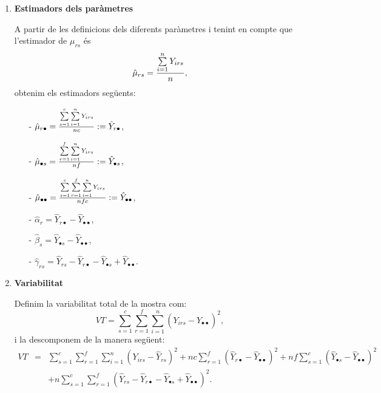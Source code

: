 \begin{enumerate}
\item {\bf Estimadors dels par\`ametres}

A partir de les definicions dels diferents par\`ametres i tenint en compte que
l'estimador de $\mu_{rs}$ \'es
$$\hat{\mu}_{rs} = {\sum\limits_{i=1}^n Y_{irs} \over n},$$
obtenim els estimadors seg\"uents:
\begin{itemize}

\item[-] $\hat{\mu}_{r\bullet} = {\sum\limits_{s=1}^c \sum\limits_{i=1}^n Y_{irs} \over n
c} := \hat{Y}_{r\bullet}$,

\item[-] $\hat{\mu}_{\bullet s} = {\sum\limits_{r=1}^f \sum\limits_{i=1}^n Y_{irs} \over n
f} := \hat{Y}_{\bullet s}$,

\item[-] $\hat{\mu}_{\bullet\bullet} = {\sum\limits_{s=1}^c \sum\limits_{r=1}^f
\sum\limits_{i=1}^n Y_{irs} \over n f c} := \hat{Y}_{\bullet\bullet}$,

\item[-] $\hat{\alpha}_r = \hat{Y}_{r\bullet} - \hat{Y}_{\bullet\bullet}$,

\item[-] $\hat{\beta}_s = \hat{Y}_{\bullet s} - \hat{Y}_{\bullet\bullet}$,

\item[-] $\hat{\gamma}_{rs} = \hat{Y}_{rs} - \hat{Y}_{r\bullet} - 
\hat{Y}_{\bullet s} + \hat{Y}_{\bullet\bullet}$.
\end{itemize}

\item {\bf Variabilitat}

Definim la variabilitat total de la mostra com:
$$VT = \sum\limits_{s=1}^c \sum\limits_{r=1}^f \sum\limits_{i=1}^n (Y_{irs} -
\hat{Y}_{\bullet\bullet})^2,$$
i la descomponem de la manera seg\"uent:
\begin{eqnarray*}
VT & = & \sum\limits_{s=1}^c \sum\limits_{r=1}^f \sum\limits_{i=1}^n (Y_{irs} -
\hat{Y}_{rs})^2 + n c \sum\limits_{r=1}^f (\hat{Y}_{r\bullet} - 
\hat{Y}_{\bullet\bullet})^2 + n f \sum\limits_{s=1}^c (\hat{Y}_{\bullet s} - 
\hat{Y}_{\bullet\bullet})^2 \\ & & + n \sum\limits_{s=1}^c
\sum\limits_{r=1}^f (\hat{Y}_{rs} - \hat{Y}_{r\bullet} - \hat{Y}_{\bullet s} +
\hat{Y}_{\bullet\bullet})^2.
\end{eqnarray*}


\end{enumerate}

